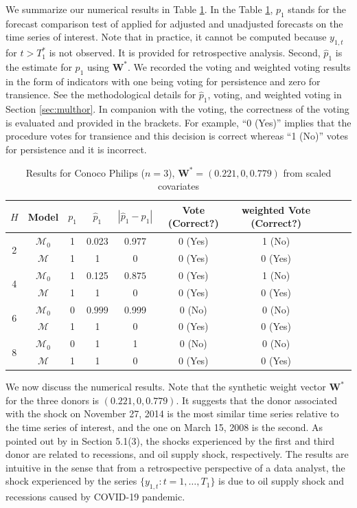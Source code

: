 \documentclass[11pt]{article}
\def\mbf#1{\mathbf{#1}} %
\def\mc#1{\mathcal{#1}} %
\def\mc#1{\mathcal{#1}}
\theoremstyle{definition}
\begin{document}
We summarize our numerical results in Table \ref{coptable}. In the Table \ref{coptable}, $p_1$ stands for the forecast comparison test of \cite{quaedvlieg2021multi} applied for adjusted and unadjusted forecasts on the time series of interest. Note that in practice, it cannot be computed because  $y_{1, t}$ for $t > T_1^*$ is not observed. It is provided   for retrospective  analysis. Second, $\hat{p}_1$ is the  estimate for $p_1$ using $\mbf{W}^*$.  We recorded the voting and weighted voting results in the form of indicators with one being voting for persistence and zero for transience. See the methodological details for $\hat{p}_1$, voting, and weighted voting in Section \ref{sec:multhor}. In companion with the voting, the correctness of the voting is evaluated and provided  in the brackets. For example, ``0 (Yes)'' implies  that the procedure votes for transience and this decision is correct whereas ``1 (No)'' votes for persistence and it is incorrect. 


\begin{table}[H]
	\caption{Results for Conoco Philips ($n=3$), $\mbf{W}^* = (0.221, 0, 0.779)$ from scaled covariates} \label{coptable}
\begin{center}
  \begin{tabular}{cccccccccr}
     $H$  & Model &   $p_1$ & $\hat{p}_1$ & $|\hat{p}_1-p_1|$ & Vote (Correct?) & weighted Vote (Correct?)   \\
     \hline 
     \multirow{2}{*}{2} & $\mc{M}_0$  &   1 & 0.023  & 0.977 & 0 (Yes) & 1 (No)  \\      
      & $\mc{M}$  & 1 & 1 & $0$   & 0 (Yes) &0 (Yes)   \\[.2cm]
     \multirow{2}{*}{4} & $\mc{M}_0$ &   1 & 0.125 & $0.875$ & 0 (Yes) &1 (No)    \\
      &  $\mc{M}$ & 1& 1 & 0 &0 (Yes)  &0 (Yes)  \\[.2cm]
     \multirow{2}{*}{6} &  $\mc{M}_0$ &   0   & $0.999$ & 0.999 & 0 (No) &0 (No)   \\
      &  $\mc{M}$ & 1 & 1  & 0 &0 (Yes) & 0 (Yes) \\[.2cm]
     \multirow{2}{*}{8} & $\mc{M}_0$ & 0  & 1 & 1 & 0 (No) & 0 (No)\\
     & $\mc{M}$ & 1 & 1 & 0 & 0 (Yes) & 0 (Yes)
  \end{tabular}
\end{center}	
\end{table}


We now discuss the numerical results. Note that the synthetic weight vector $\mbf{W}^*$ for the three donors is $(0.221, 0, 0.779)$. It suggests that the donor associated with the shock on November 27, 2014 is the most similar time series relative to the time series of interest, and the one on March 15, 2008 is the second. As pointed out by \cite{lin2021minimizing} in Section 5.1(3), the shocks experienced by the first and  third donor are related to recessions, and oil supply shock, respectively. The results are intuitive in the sense that from a retrospective perspective of a data analyst, the shock experienced by the series $\{y_{1,t}\colon t = 1, \ldots, T_1\}$ is due to oil supply shock and recessions caused by COVID-19 pandemic.
\end{document}
